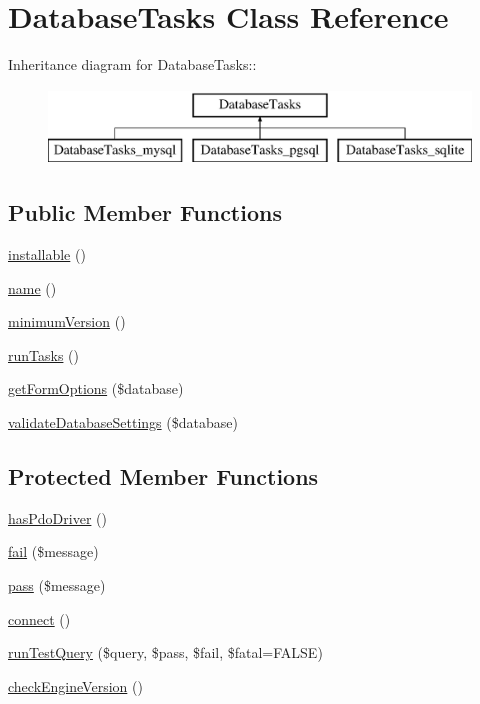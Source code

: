 \hypertarget{classDatabaseTasks}{
\section{DatabaseTasks Class Reference}
\label{classDatabaseTasks}
}
Inheritance diagram for DatabaseTasks::\begin{figure}[H]
\begin{center}
\leavevmode
\includegraphics[height=2cm]{classDatabaseTasks}
\end{center}
\end{figure}
\subsection*{Public Member Functions}
\begin{DoxyCompactItemize}
\item 
\hyperlink{classDatabaseTasks_aea31e0c70a1870a0290ab2ee06f364e1}{installable} ()
\item 
\hyperlink{classDatabaseTasks_ae582e57b43461aad87f47ad0d37b6c9a}{name} ()
\item 
\hyperlink{classDatabaseTasks_a840dd551944911605ee2e139a434efea}{minimumVersion} ()
\item 
\hyperlink{classDatabaseTasks_a02a8ac31c7ed2c7798732ef5cf8482d0}{runTasks} ()
\item 
\hyperlink{classDatabaseTasks_a97968c7dd7807a65a301a27ea3d15480}{getFormOptions} (\$database)
\item 
\hyperlink{classDatabaseTasks_a44116b4f564f8fcfdd5ade73853419b8}{validateDatabaseSettings} (\$database)
\end{DoxyCompactItemize}
\subsection*{Protected Member Functions}
\begin{DoxyCompactItemize}
\item 
\hyperlink{classDatabaseTasks_a04d6c3b18630c969106bb890a0156e34}{hasPdoDriver} ()
\item 
\hyperlink{classDatabaseTasks_a97dfb29bafb3aeca1eeba6caec27f203}{fail} (\$message)
\item 
\hyperlink{classDatabaseTasks_ab95a2718467b938c7116b5d2feeb9a4c}{pass} (\$message)
\item 
\hyperlink{classDatabaseTasks_a64f74ab2f1de175c8b472223a9267ce7}{connect} ()
\item 
\hyperlink{classDatabaseTasks_a53da139c1b17ae90a0f6df6dd003c0ca}{runTestQuery} (\$query, \$pass, \$fail, \$fatal=FALSE)
\item 
\hyperlink{classDatabaseTasks_a0e94441f09146aa9d6a991f7483f19d1}{checkEngineVersion} ()
\end{DoxyCompactItemize}
